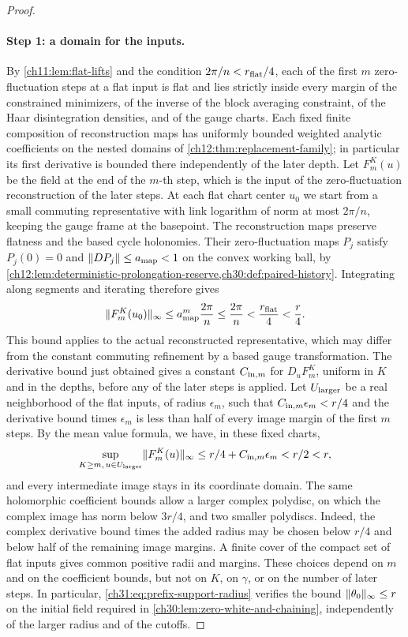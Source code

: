 \begin{proof}
\paragraph{Step 1: a domain for the inputs.}
By \cref{ch11:lem:flat-lifts} and the condition $2\pi/n<r_{\rm flat}/4$, each of the first $m$ zero-fluctuation steps at a flat input is flat and lies strictly inside every margin of the constrained minimizers, of the inverse of the block averaging constraint, of the Haar disintegration densities, and of the gauge charts. Each fixed finite composition of reconstruction maps has uniformly bounded weighted analytic coefficients on the nested domains of \cref{ch12:thm:replacement-family}; in particular its first derivative is bounded there independently of the later depth. Let $F_m^K(u)$ be the field at the end of the $m$-th step, which is the input of the zero-fluctuation reconstruction of the later steps. At each flat chart center $u_0$ we start from a small commuting representative with link logarithm of norm at most $2\pi/n$, keeping the gauge frame at the basepoint. The reconstruction maps preserve flatness and the based cycle holonomies. Their zero-fluctuation maps $P_j$ satisfy $P_j(0)=0$ and $\|DP_j\|\le a_{\rm map}<1$ on the convex working ball, by \cref{ch12:lem:deterministic-prolongation-reserve,ch30:def:paired-history}. Integrating along segments and iterating therefore gives
\[
 \lVert F_m^K(u_0)\rVert_\infty\le a_{\rm map}^m\frac{2\pi}{n}
 \le\frac{2\pi}{n}<\frac{r_{\rm flat}}4<\frac r4.
\]
This bound applies to the actual reconstructed representative, which may differ from the constant commuting refinement by a based gauge transformation. The derivative bound just obtained gives a constant $C_{{\rm in},m}$ for $D_uF_m^K$, uniform in $K$ and in the depths, before any of the later steps is applied. Let $U_{\rm larger}$ be a real neighborhood of the flat inputs, of radius $\epsilon_m$, such that $C_{{\rm in},m}\epsilon_m<r/4$ and the derivative bound times $\epsilon_m$ is less than half of every image margin of the first $m$ steps. By the mean value formula, we have, in these fixed charts,
\begin{equation}\label{ch31:eq:prefix-support-radius}
 \sup_{K\ge m,\,u\in U_{\rm larger}}\lVert F_m^K(u)\rVert_\infty\le r/4+C_{{\rm in},m}\epsilon_m<r/2<r,
\end{equation}
and every intermediate image stays in its coordinate domain. The same holomorphic coefficient bounds allow a larger complex polydisc, on which the complex image has norm below $3r/4$, and two smaller polydiscs. Indeed, the complex derivative bound times the added radius may be chosen below $r/4$ and below half of the remaining image margins. A finite cover of the compact set of flat inputs gives common positive radii and margins. These choices depend on $m$ and on the coefficient bounds, but not on $K$, on $\gamma$, or on the number of later steps. In particular, \eqref{ch31:eq:prefix-support-radius} verifies the bound $\lVert \theta_0\rVert_\infty\le r$ on the initial field required in \cref{ch30:lem:zero-white-and-chaining}, independently of the larger radius and of the cutoffs.


\end{proof}
